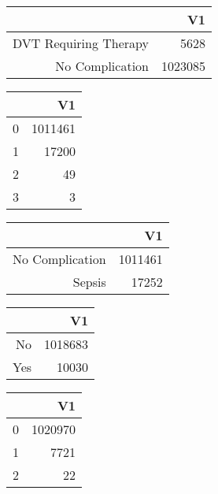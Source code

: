 \bigskip\bigskip
\centering
\begin{tabular}{rr}
  \hline
 & V1 \\ 
  \hline
DVT Requiring Therapy & 5628 \\ 
  No Complication & 1023085 \\ 
   \hline
\end{tabular}

\bigskip\bigskip
\centering
\begin{tabular}{rr}
  \hline
 & V1 \\ 
  \hline
0 & 1011461 \\ 
  1 & 17200 \\ 
  2 &  49 \\ 
  3 &   3 \\ 
   \hline
\end{tabular}

\bigskip\bigskip
\centering
\begin{tabular}{rr}
  \hline
 & V1 \\ 
  \hline
No Complication & 1011461 \\ 
  Sepsis & 17252 \\ 
   \hline
\end{tabular}

\bigskip\bigskip
\centering
\begin{tabular}{rr}
  \hline
 & V1 \\ 
  \hline
No & 1018683 \\ 
  Yes & 10030 \\ 
   \hline
\end{tabular}

\bigskip\bigskip
\centering
\begin{tabular}{rr}
  \hline
 & V1 \\ 
  \hline
0 & 1020970 \\ 
  1 & 7721 \\ 
  2 &  22 \\ 
   \hline
\end{tabular}

